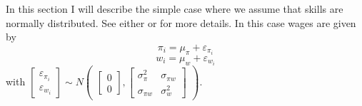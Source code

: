 \documentclass[12 pt]{article}
\begin{document}
In this section I will describe the simple case where we assume that skills are normally distributed. See either \citet{heckman1990empirical} or \citet{french2011identification} for more details. In this case wages are given by
\begin{equation}
	\pi_i = \mu_\pi + \varepsilon_{\pi_i}
	\label{eqn:pi_simple_app}
\end{equation}
\begin{equation}
	w_i = \mu_w + \varepsilon_{w_i}
	\label{eqn:w_simple_app}
\end{equation}
with $\begin{bmatrix}
	\varepsilon_{\pi_i}\\
	\varepsilon_{w_i}
\end{bmatrix} \sim N \begin{pmatrix}
	\begin{bmatrix}
		0\\
		0
	\end{bmatrix},
	\begin{bmatrix}
		\sigma_\pi^2 & \sigma_{\pi w}\\
		\sigma_{\pi w} & \sigma_w^2 
	\end{bmatrix}
\end{pmatrix}$.
\end{document}
